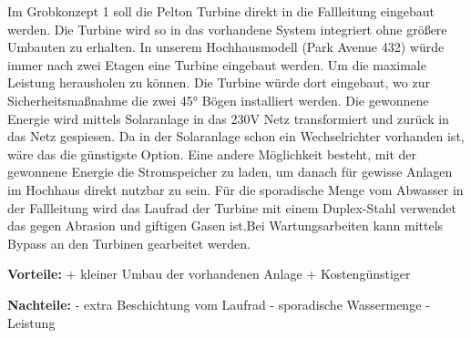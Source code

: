 Im Grobkonzept 1 soll die Pelton Turbine direkt in die Fallleitung eingebaut werden. Die Turbine wird so in das vorhandene System integriert ohne größere Umbauten zu erhalten.
In unserem Hochhausmodell (Park Avenue 432) würde immer nach zwei Etagen eine Turbine eingebaut werden. Um die maximale Leistung herausholen zu können. Die Turbine würde dort eingebaut, wo zur Sicherheitsmaßnahme die zwei 45° Bögen installiert werden. 
Die gewonnene Energie wird mittels Solaranlage in das 230V Netz transformiert und zurück in das Netz gespiesen. Da in der Solaranlage schon ein Wechselrichter vorhanden ist, wäre das die günstigste Option. Eine andere Möglichkeit besteht, mit der gewonnene Energie die Stromspeicher zu laden, um danach für gewisse Anlagen im Hochhaus direkt nutzbar zu sein.
Für die sporadische Menge vom Abwasser in der Fallleitung wird das Laufrad der Turbine mit einem Duplex-Stahl verwendet das gegen Abrasion und giftigen Gasen ist.Bei Wartungsarbeiten kann mittels Bypass an den Turbinen gearbeitet werden.

\textbf{Vorteile:}												\newline
+	kleiner Umbau der vorhandenen Anlage			\newline
+	Kostengünstiger											\newline
	
\textbf{Nachteile:}												\newline
- 	extra Beschichtung vom Laufrad					\newline
-	sporadische Wassermenge							\newline
-	Leistung														\newline


